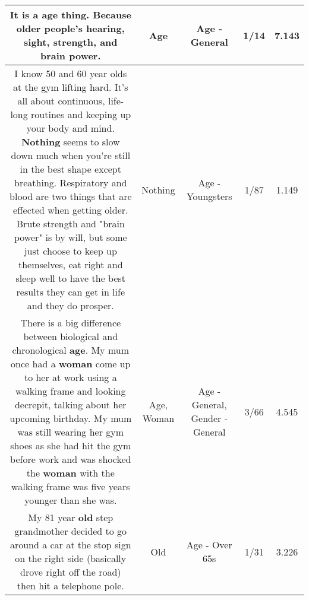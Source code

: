 \documentclass[11pt]{article}
\newlength\mylength
\begin{document}
\begin{center}
\begin{longtable}{|C{.65\mylength}|C{.30\mylength}|C{.12\mylength}|C{.12\mylength}|C{.12\mylength}|}
  \small It is a \textbf{age} thing. Because older people's hearing, sight, strength, and brain power.\normalsize   & Age & Age - General & 1/14 & 7.143 \\  \hline
  \small I know 50 and 60 year olds at the gym lifting hard. It's all about continuous, life-long routines and keeping up your body and mind. \textbf{Nothing} seems to slow down much when you're still in the best shape except breathing. Respiratory and blood are two things that are effected when getting older. Brute strength and "brain power" is by will, but some just choose to keep up themselves, eat right and sleep well to have the best results they can get in life and they do prosper.\normalsize   & Nothing & Age - Youngsters & 1/87 & 1.149 \\  \hline
  \small There is a big difference between biological and chronological \textbf{age}. My mum once had a \textbf{woman} come up to her at work using a walking frame and looking decrepit, talking about her upcoming birthday. My mum was still wearing her gym shoes as she had hit the gym before work and was shocked the \textbf{woman} with the walking frame was five years younger than she was.\normalsize   & Age, Woman & Age - General, Gender - General & 3/66 & 4.545 \\  \hline
  \small My 81 year \textbf{old} step grandmother decided to go around a car at the stop sign on the right side (basically drove right off the road) then hit a telephone pole.\normalsize   & Old & Age - Over 65s & 1/31 & 3.226 \\  \hline

\end{longtable}
\end{center}
\end{document}

